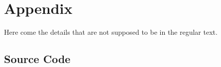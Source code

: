 \chapter{Appendix}
\label{chapter:DetailedDescriptions}
Here come the details that are not supposed to be in the regular text.
\section{Source Code}

